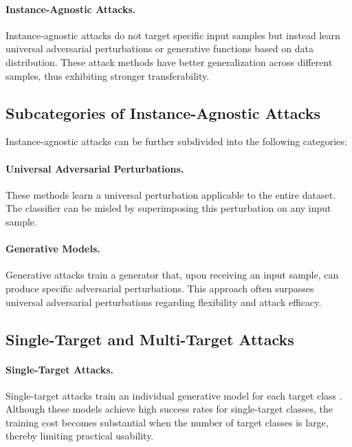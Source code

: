 \paragraph{Instance-Agnostic Attacks.} Instance-agnostic attacks \cite{xiao2018generating, luo2021generating, kong2020physgan, naseer2019cross, naseer2021generating, feng2023dynamic} do not target specific input samples but instead learn universal adversarial perturbations or generative functions based on data distribution. These attack methods have better generalization across different samples, thus exhibiting stronger transferability.

\subsection{Subcategories of Instance-Agnostic Attacks}

Instance-agnostic attacks can be further subdivided into the following categories:

\paragraph{Universal Adversarial Perturbations.} These methods learn a universal perturbation \cite{moosavi2017universal, zhang2020understanding} applicable to the entire dataset. The classifier can be misled by superimposing this perturbation on any input sample.

\paragraph{Generative Models.} Generative attacks \cite{poursaeed2018generative, naseer2019cross} train a generator that, upon receiving an input sample, can produce specific adversarial perturbations. This approach often surpasses universal adversarial perturbations regarding flexibility and attack efficacy.

\subsection{Single-Target and Multi-Target Attacks}

\paragraph{Single-Target Attacks.} Single-target attacks train an individual generative model for each target class \cite{naseer2019cross, naseer2021generating, feng2023dynamic, wang2023towards}. Although these models achieve high success rates for single-target classes, the training cost becomes substantial when the number of target classes is large, thereby limiting practical usability.

